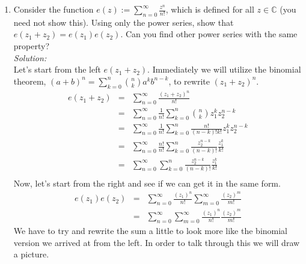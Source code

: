 \documentclass[10pt]{amsart}
\theoremstyle{nonumberplain}
\begin{document}
\begin{enumerate}[label={\bf {\arabic*}:}]
\item Consider the function $e(z):=\sum_{n=0}^{\infty}
  \frac{z^n}{n!}$, which is defined for all $z \in \mathbb{C}$ (you
  need not show this). Using only the power series, show that
  $e\left(z_1+z_2\right)=e\left(z_1\right) e\left(z_2\right)$. Can you
  find other power series with the same property? \\
\textit{Solution:} \\
Let's start from the left $e\left(z_1+z_2\right)$.
Immediately we will utilize the binomial theorem, $(a + b)^n = \sum_{k=0}^{n} {n \choose k}a^k b^{n-k} $, to rewrite $(z_1+z_2)^n$. \\
\begin{eqnarray*}
e\left(z_1+z_2\right) &=& \sum_{n=0}^{\infty} \frac{(z_1+z_2)^n}{n!} \\
			       &=& \sum_{n=0}^{\infty} \frac{1}{n!} \sum_{k=0}^{n} {n \choose k}z_1^k z_2^{n-k} \\
			       &=& \sum_{n=0}^{\infty} \frac{1}{n!} \sum_{k=0}^{n} \frac{n!}{(n-k)! k!}z_1^k z_2^{n-k} \\
			       &=& \sum_{n=0}^{\infty} \frac{n!}{n!} \sum_{k=0}^{n} \frac{z_2^{n-k}}{(n-k)!} \frac{z_1^k}{k!} \\
			       &=& \sum_{n=0}^{\infty} \sum_{k=0}^{n} \frac{z_2^{n-k}}{(n-k)!} \frac{z_1^k}{k!} \\
\end{eqnarray*}
Now, let's start from the right and see if we can get it in the same form.
\begin{eqnarray*}
e\left(z_1\right) e\left(z_2\right) &=& \sum_{n=0}^{\infty} \frac{(z_1)^n}{n!} \sum_{m=0}^{\infty} \frac{(z_2)^m}{m!} \\
			       		        &=& \sum_{n=0}^{\infty} \sum_{m=0}^{\infty} \frac{(z_1)^n}{n!} \frac{(z_2)^m}{m!}
\end{eqnarray*}
We have to try and rewrite the sum a little to look more like the binomial version we arrived at from the left.
In order to talk through this we will draw a picture.

\end{enumerate}
\end{document}
